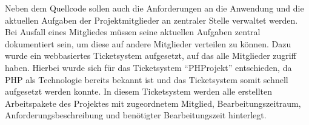 
Neben dem Quellcode sollen auch die Anforderungen an die Anwendung und die
aktuellen Aufgaben der Projektmitglieder an zentraler Stelle verwaltet werden.
Bei Ausfall eines Mitgliedes müssen seine aktuellen Aufgaben zentral
dokumentiert sein, um diese auf andere Mitglieder verteilen zu können. Dazu
wurde ein webbasiertes Ticketsystem aufgesetzt, auf das alle Mitglieder zugriff
haben. Hierbei wurde sich für das Ticketsystem "`PHProjekt"' entschieden, da PHP
als Technologie bereits bekannt ist und das Ticketsystem somit schnell
aufgesetzt werden konnte. In diesem Ticketsystem werden alle erstellten
Arbeitspakete des Projektes mit zugeordnetem Mitglied, Bearbeitungszeitraum,
Anforderungsbeschreibung und benötigter Bearbeitungszeit hinterlegt.